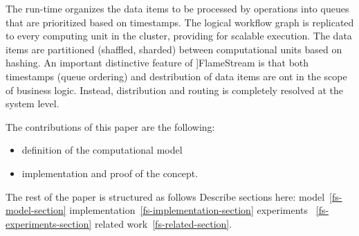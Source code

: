 The \FlameStream run-time organizes the data items to be processed by operations into queues  that are prioritized  based on timestamps.  The logical workflow graph is replicated to every computing unit in the cluster, providing for scalable execution. The data items are partitioned (shaffled, sharded) between computational units based on hashing. An important distinctive feature of ]FlameStream is that both timestamps (queue ordering) and destribution of data items are ont in the scope of business logic. Instead, distribution and routing is completely resolved at the system level.


The contributions of this paper are the following:

\begin {itemize}
\item definition of the computational model
\item implementation and proof of the concept.
\end {itemize}

The rest of the paper is structured as follows 
Describe sections here: model~\ref {fs-model-section}
implementation~\ref{fs-implementation-section}
experiments ~\ref{fs-experiments-section}
related work~\ref{fs-related-section}.


\endinput
